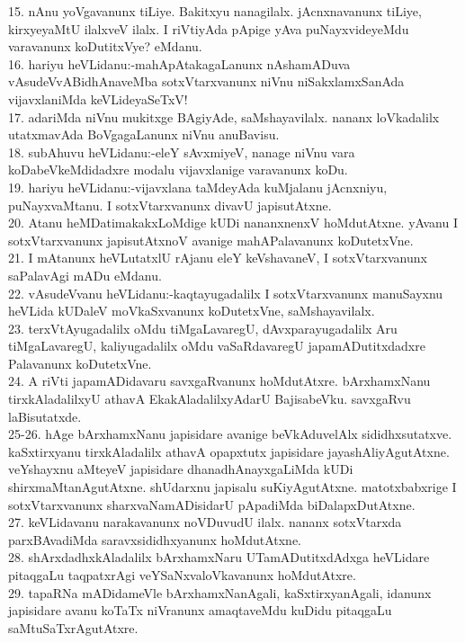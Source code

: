 \documentclass{article}
\begin{document}
15. nAnu yoVgavanunx tiLiye. Bakitxyu nanagilalx. jAcnxnavanunx tiLiye, kirxyeyaMtU ilalxveV ilalx. I riVtiyAda pApige yAva puNayxvideyeMdu varavanunx koDutitxVye? eMdanu.\\
16. hariyu heVLidanu:-mahApAtakagaLanunx nAshamADuva vAsudeVvABidhAnaveMba sotxVtarxvanunx niVnu niSakxlamxSanAda vijavxlaniMda keVLideyaSeTxV!\\
17. adariMda niVnu mukitxge BAgiyAde, saMshayavilalx. nananx loVkadalilx utatxmavAda BoVgagaLanunx niVnu anuBavisu.\\
18. subAhuvu heVLidanu:-eleY sAvxmiyeV, nanage niVnu vara koDabeVkeMdidadxre modalu vijavxlanige varavanunx koDu.\\
19. hariyu heVLidanu:-vijavxlana taMdeyAda kuMjalanu jAcnxniyu, puNayxvaMtanu. I sotxVtarxvanunx divavU japisutAtxne.\\
20. Atanu heMDatimakakxLoMdige kUDi nananxnenxV hoMdutAtxne. yAvanu I sotxVtarxvanunx japisutAtxnoV avanige mahAPalavanunx koDutetxVne.\\
21. I mAtanunx heVLutatxlU rAjanu eleY keVshavaneV, I sotxVtarxvanunx saPalavAgi mADu eMdanu.\\
22. vAsudeVvanu heVLidanu:-kaqtayugadalilx I sotxVtarxvanunx manuSayxnu heVLida kUDaleV moVkaSxvanunx koDutetxVne, saMshayavilalx.\\
23. terxVtAyugadalilx oMdu tiMgaLavaregU, dAvxparayugadalilx Aru tiMgaLavaregU, kaliyugadalilx oMdu vaSaRdavaregU japamADutitxdadxre Palavanunx koDutetxVne.\\
24. A riVti japamADidavaru savxgaRvanunx hoMdutAtxre. bArxhamxNanu tirxkAladalilxyU athavA EkakAladalilxyAdarU BajisabeVku. savxgaRvu laBisutatxde.\\
25-26. hAge bArxhamxNanu japisidare avanige beVkAduvelAlx sididhxsutatxve. kaSxtirxyanu tirxkAladalilx athavA opapxtutx japisidare jayashAliyAgutAtxne. veYshayxnu aMteyeV japisidare dhanadhAnayxgaLiMda kUDi shirxmaMtanAgutAtxne. shUdarxnu japisalu suKiyAgutAtxne. matotxbabxrige I sotxVtarxvanunx sharxvaNamADisidarU pApadiMda biDalapxDutAtxne.\\
27. keVLidavanu narakavanunx noVDuvudU ilalx. nananx sotxVtarxda parxBAvadiMda saravxsididhxyanunx hoMdutAtxne.\\
28. shArxdadhxkAladalilx bArxhamxNaru UTamADutitxdAdxga heVLidare pitaqgaLu taqpatxrAgi veYSaNxvaloVkavanunx hoMdutAtxre.\\
29. tapaRNa mADidameVle bArxhamxNanAgali, kaSxtirxyanAgali, idanunx japisidare avanu koTaTx niVranunx amaqtaveMdu kuDidu pitaqgaLu saMtuSaTxrAgutAtxre.\\
\end{document}
